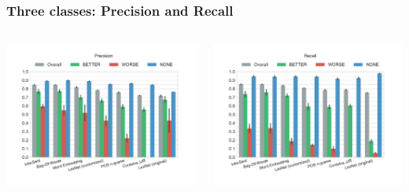 \documentclass[11pt,aspectratio=169]{beamer}
\begin{document}
    \begin{frame}
        \frametitle{Three classes: Precision and Recall}
        \begin{columns}[t]
            \column{2in}
            \centerline{\includegraphics[scale=0.31,trim={2cm 0 0 0},clip]{images/experiments/p-precision-False}}
            \column{2in}
            \centerline{\includegraphics[scale=0.31,trim={0 0 2cm 0},clip]{images/experiments/p-recall-False}}

        \end{columns}
    \end{frame}
\end{document}
